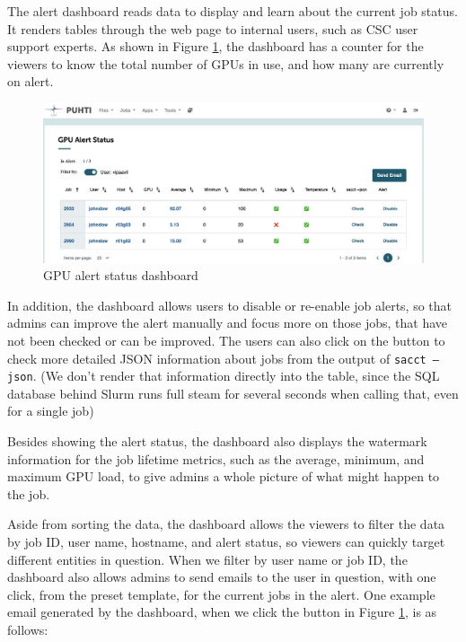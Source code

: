 The alert dashboard reads data to display and learn about the current job status. It renders tables through the web page to internal users, such as CSC user support experts. As shown in Figure \ref{fig_status_dashboard}, the dashboard has a counter for the viewers to know the total number of GPUs in use, and how many are currently on alert. 

\begin{figure}[H]
    \centering
    \includegraphics[width=1.1\textwidth]{figures/status-dashboard.png}
    \caption{GPU alert status dashboard}
    \label{fig_status_dashboard}
\end{figure}

In addition, the dashboard allows users to disable or re-enable job alerts, so that admins can improve the alert manually and focus more on those jobs, that have not been checked or can be improved. The users can also click on the button to check more detailed JSON information about jobs from the output of \texttt{sacct --json}. (We don't render that information directly into the table, since the SQL database behind Slurm runs full steam for several seconds when calling that, even for a single job)

Besides showing the alert status, the dashboard also displays the watermark information for the job lifetime metrics, such as the average, minimum, and maximum GPU load, to give admins a whole picture of what might happen to the job.

Aside from sorting the data, the dashboard allows the viewers to filter the data by job ID, user name, hostname, and alert status, so viewers can quickly target different entities in question. When we filter by user name or job ID, the dashboard also allows admins to send emails to the user in question, with one click, from the preset template, for the current jobs in the alert. One example email generated by the dashboard, when we click the button in Figure \ref{fig_status_dashboard}, is as follows:

